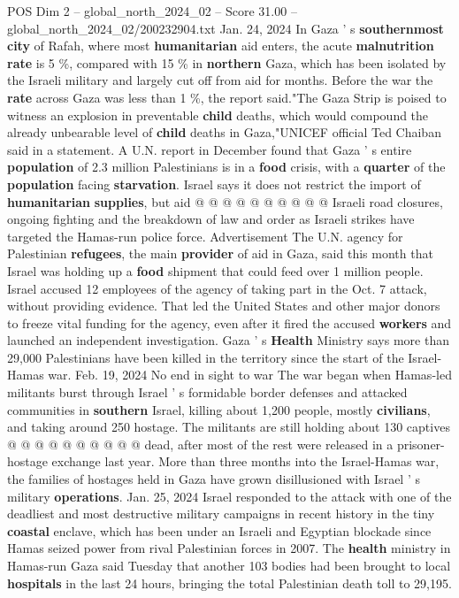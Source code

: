 \begin{textsample}{POS Dim 2 – global\_north\_2024\_02 – Score 31.00 – global\_north\_2024\_02/200232904.txt}
Jan. 24, 2024 In Gaza ' s \textbf{southernmost} \textbf{city} of Rafah, where most \textbf{humanitarian} aid enters, the acute \textbf{malnutrition} \textbf{rate} is 5 \%, compared with 15 \% in \textbf{northern} Gaza, which has been isolated by the Israeli military and largely cut off from aid for months.
Before the war the \textbf{rate} across Gaza was less than 1 \%, the report said."The Gaza Strip is poised to witness an explosion in preventable \textbf{child} deaths, which would compound the already unbearable level of \textbf{child} deaths in Gaza,"UNICEF official Ted Chaiban said in a statement.
A U.N. report in December found that Gaza ' s entire \textbf{population} of 2.3 million Palestinians is in a \textbf{food} crisis, with a \textbf{quarter} of the \textbf{population} facing \textbf{starvation}.
Israel says it does not restrict the import of \textbf{humanitarian} \textbf{supplies}, but aid @ @ @ @ @ @ @ @ @ @ Israeli road closures, ongoing fighting and the breakdown of law and order as Israeli strikes have targeted the Hamas-run police force.
Advertisement The U.N. agency for Palestinian \textbf{refugees}, the main \textbf{provider} of aid in Gaza, said this month that Israel was holding up a \textbf{food} shipment that could feed over 1 million people.
Israel accused 12 employees of the agency of taking part in the Oct. 7 attack, without providing evidence.
That led the United States and other major donors to freeze vital funding for the agency, even after it fired the accused \textbf{workers} and launched an independent investigation.
Gaza ' s \textbf{Health} Ministry says more than 29,000 Palestinians have been killed in the territory since the start of the Israel-Hamas war.
Feb. 19, 2024 No end in sight to war The war began when Hamas-led militants burst through Israel ' s formidable border defenses and attacked communities in \textbf{southern} Israel, killing about 1,200 people, mostly \textbf{civilians}, and taking around 250 hostage.
The militants are still holding about 130 captives @ @ @ @ @ @ @ @ @ @ dead, after most of the rest were released in a prisoner-hostage exchange last year.
More than three months into the Israel-Hamas war, the families of hostages held in Gaza have grown disillusioned with Israel ' s military \textbf{operations}.
Jan. 25, 2024 Israel responded to the attack with one of the deadliest and most destructive military campaigns in recent history in the tiny \textbf{coastal} enclave, which has been under an Israeli and Egyptian blockade since Hamas seized power from rival Palestinian forces in 2007.
The \textbf{health} ministry in Hamas-run Gaza said Tuesday that another 103 bodies had been brought to local \textbf{hospitals} in the last 24 hours, bringing the total Palestinian death toll to 29,195.

\end{textsample}
